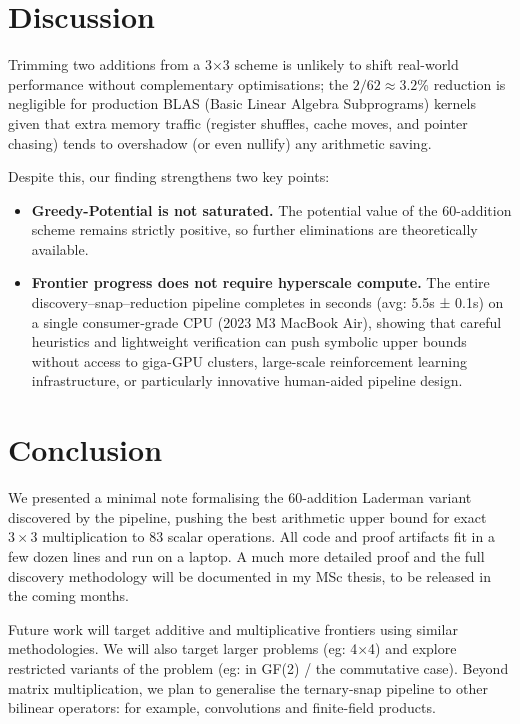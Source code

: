 \documentclass[11pt]{article}
\begin{document}
\newpage

\section{Discussion}
Trimming two additions from a 3$\times$3 scheme is unlikely to shift real-world performance without complementary optimisations; the $2/62\approx3.2$\% reduction is negligible for production BLAS (Basic Linear Algebra Subprograms) kernels given that extra memory traffic (register shuffles, cache moves, and pointer chasing) tends to overshadow (or even nullify) any arithmetic saving.

Despite this, our finding strengthens two key points:
\begin{itemize}
  \item \textbf{Greedy-Potential is not saturated.}  The potential value of the $60$-addition scheme remains strictly positive, so further eliminations are theoretically available.

  \item \textbf{Frontier progress does not require hyperscale compute.}
        The entire discovery–snap–reduction pipeline completes in seconds (avg: 5.5s ± 0.1s) on a single consumer‐grade CPU (2023 M3 MacBook Air), showing that careful heuristics and lightweight verification can push symbolic upper bounds without access to giga-GPU clusters, large-scale reinforcement learning infrastructure, or particularly innovative human-aided pipeline design.
\end{itemize}

\section{Conclusion}
We presented a minimal note formalising the $60$-addition Laderman variant discovered by the pipeline, pushing the best arithmetic upper bound for exact $3\times3$ multiplication to $83$ scalar operations. All code and proof artifacts fit in a few dozen lines and run on a laptop. A much more detailed proof and the full discovery methodology will be documented in my MSc thesis, to be released in the coming months.

Future work will target additive and multiplicative frontiers using similar methodologies. We will also target larger problems (eg: 4$\times$4) and explore restricted variants of the problem (eg: in GF(2) / the commutative case). Beyond matrix multiplication, we plan to generalise the ternary-snap pipeline to other bilinear operators: for example, convolutions and finite-field products.
\end{document}
